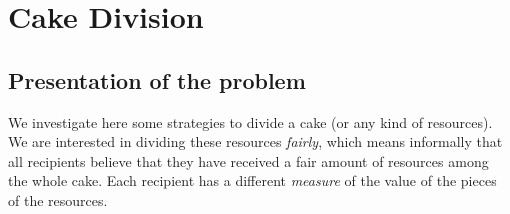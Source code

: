 
\chapter{Cake Division}
\label{Appendix:CakeDivision}

\section{Presentation of the problem}

We investigate here some strategies to divide a cake
(or any kind of resources). We are interested in dividing these resources \textit{fairly}, 
which means informally that all recipients believe that they have received a fair amount of resources among the whole cake. 
Each recipient has a different \textit{measure} of the value of the pieces of the resources. 

